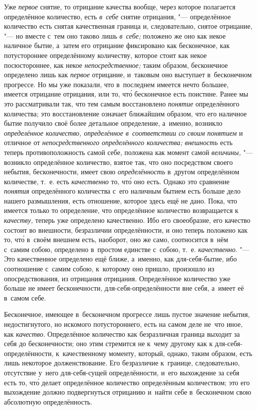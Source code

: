 Уже {\em первое} снятие, то отрицание качества вообще, через которое полагается
определённое количество, есть {\em в~себе} снятие отрицания, "--- определённое
количество есть снятая качественная граница и, следовательно, снятое отрицание,
"--- но вместе с~тем оно таково лишь {\em в~себе;} положено же оно как некое
наличное бытие, а~затем его отрицание фиксировано как бесконечное, как
потустороннее определённому количеству, которое стоит как некое посюстороннее,
как некое {\em непосредственное;} таким образом, бесконечное определено лишь
как {\em первое} отрицание, и~таковым оно выступает в~бесконечном прогрессе.
Но мы уже показали, что в~последнем имеется нечто большее, имеется отрицание
отрицания, или то, чт\'{о} бесконечное есть поистине. Ранее мы это
рассматривали так, что тем самым восстановлено {\em понятие} определённого
количества; это восстановление означает ближайшим образом, что его наличное
бытие получило своё более детальное определение, а~именно, возникло
{\em определённое количество, определённое в~соответствии со своим понятием}
и отличное от {\em непосредственного определённого количества; внешность} есть
теперь противоположность самой себе, положена как момент самой {\em величины,}
"--- возникло определённое количество, взятое так, что оно посредством своего
небытия, бесконечности, имеет свою {\em определённость} в~другом определённом
количестве, т.~е. есть {\em качественно} то, чт\'{о} оно есть. Однако это
сравнение {\em понятия} определённого количества с~его наличным бытием есть
больше дело нашего размышления, есть отношение, которое здесь ещё не дано.
Пока, что имеется только то определение, что определённое количество
возвращается к {\em качеству,} теперь уже определено качественно. Ибо его
своеобразие, его качество состоит во внешности, безразличии определённости,
и оно теперь положено как то, чт\'{о} в~своём внешнем есть, наоборот, оно же
само, соотносится в~нём с~самим собою, определено в~простом единстве с~собою,
т.~е. {\em качественно}. "--- Это качественное определено ещё ближе, а~именно,
как для-себя-бытие, ибо соотношение с~самим собою, к~которому оно пришло,
произошло из опосредствования, из отрицания отрицания. Определённое количество
уже больше не имеет бесконечности, для-себя-определённости вне себя,
а~имеет её в~самом себе.

Бесконечное, имеющее в~бесконечном прогрессе лишь пустое значение небытия,
недостигнутого, но искомого потустороннего, есть на самом деле не~что иное,
как {\em качество}. Определённое количество как безразличная граница выходит
за себя до бесконечности; оно этим стремится не к~чему другому как
к для-себя-определённости, к~качественному моменту, который, однако, таким
образом, есть лишь некоторое долженствование. Его безразличие к~границе,
следовательно, отсутствие у~него для-себя-сущей определённости, и~его
выхождение за себя есть то, чт\'{о} делает определённое количество определённым
количеством; это его выхождение должно подвергнуться отрицанию и~найти
себе в~бесконечном свою абсолютную определённость.

